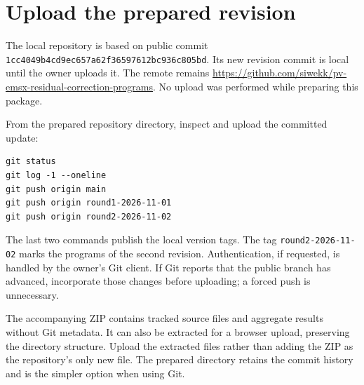 \section*{Upload the prepared revision}

The local repository is based on public commit
\texttt{1cc4049b4cd9ec657a62f36597612bc936c805bd}. Its new revision commit is local
until the owner uploads it. The remote remains
\url{https://github.com/siwekk/pv-emsx-residual-correction-programs}.
No upload was performed while preparing this package.

From the prepared repository directory, inspect and upload the committed update:

\begin{verbatim}
git status
git log -1 --oneline
git push origin main
git push origin round1-2026-11-01
git push origin round2-2026-11-02
\end{verbatim}

The last two commands publish the local version tags. The tag \texttt{round2-2026-11-02} marks the programs of the second revision. Authentication, if requested,
is handled by the owner's Git client. If Git reports that the public branch has
advanced, incorporate those changes before uploading; a forced push is unnecessary.

The accompanying ZIP contains tracked source files and aggregate results without
Git metadata. It can also be extracted for a browser upload, preserving the
directory structure. Upload the extracted files rather than adding the ZIP as
the repository's only new file. The prepared directory retains the commit
history and is the simpler option when using Git.
